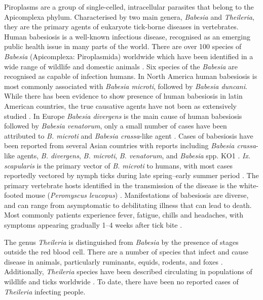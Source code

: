 \documentclass[a4paper, nobind]{templates/ociamthesis}
\begin{document}
Piroplasms are a group of single-celled, intracellular parasites that belong to the Apicomplexa phylum.
Characterised by two main genera, \emph{Babesia} and \emph{Theileria}, they are the primary agents of eukaryote tick-borne diseases in vertebrates.
Human babesiosis is a well-known infectious disease, recognised as an emerging public health issue in many parts of the world.
There are over 100 species of \emph{Babesia} (Apicomplexa: Piroplasmida) worldwide which have been identified in a wide range of wildlife and domestic animals \autocite{kumarGlobalEmergenceHuman2021}. Six species of the \emph{Babesia} are recognised as capable of infection humans. In North America human babesiosis is most commonly associated with \emph{Babesia microti}, followed by \emph{Babesia duncani}. While there has been evidence to show presence of human babesiosis in latin American countries, the true causative agents have not been as extensively studied \autocite{kumarGlobalEmergenceHuman2021}. In Europe \emph{Babesia divergens} is the main cause of human babesiosis followed by \emph{Babesia venatorum}, only a small number of cases have been attributed to \emph{B. microti} and \emph{Babesia crassa}-like agent \autocite{hildebrandtHumanBabesiosisEurope2021,vannierHumanBabesiosis2012}. Cases of babesiosis have been reported from several Asian countries with reports including \emph{Babesia crassa}-like agents, \emph{B. divergens}, \emph{B. microti}, \emph{B. venatorum}, and \emph{Babesia} spp. KO1 \autocite{kumarGlobalEmergenceHuman2021}.
\emph{Ix. scapularis} is the primary vector of \emph{B. microti} to humans, with most cases reportedly vectored by nymph ticks during late spring--early summer period \autocite{spielmanEcologyIxodesDamminiborne1985,swansonCoinfectionsAcquiredIxodes2006}.
The primary vertebrate hosts identified in the transmission of the disease is the white-footed mouse (\emph{Peromyscus leucopus}) \autocite{spielmanEcologyIxodesDamminiborne1985}.
Manifestations of babesiosis are diverse, and can range from asymptomatic to debilitating illness that can lead to death.
Most commonly patients experience fever, fatigue, chills and headaches, with symptoms appearing gradually 1--4 weeks after tick bite \autocite{vannierHumanBabesiosis2008}.

The genus \emph{Theileria} is distinguished from \emph{Babesia} by the presence of stages outside the red blood cell.
There are a number of species that infect and cause disease in animals, particularly ruminants, equids, rodents, and foxes \autocite{almazanBabesiosisTheileriosisNorth2022}.
Additionally, \emph{Theileria} species have been described circulating in populations of wildlife and ticks worldwide \autocite{mansReviewTheileriaDiagnostics2015,wattsTheileriaOrientalisReview2016}.
To date, there have been no reported cases of \emph{Theileria} infecting people.
\end{document}
